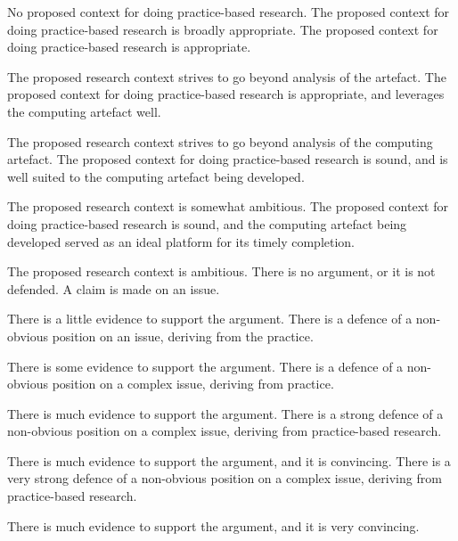 \documentclass{../../fal_assignment}
\begin{document}
\begin{markingrubric}
%
        \grade\fail No proposed context for doing practice-based research.
        \grade The proposed context for doing practice-based research is broadly appropriate.
        \grade The proposed context for doing practice-based research is appropriate.
        \par The proposed research context strives to go beyond analysis of the artefact.
        \grade The proposed context for doing practice-based research is appropriate, and leverages the computing artefact well.
        \par The proposed research context strives to go beyond analysis of the computing artefact.
        \grade The proposed context for doing practice-based research is sound, and is well suited to the computing artefact being developed.
        \par The proposed research context is somewhat ambitious.
        \grade The proposed context for doing practice-based research is sound, and the computing artefact being developed served as an ideal platform for its timely completion. 
        \par The proposed research context is ambitious.
%
        \grade\fail There is no argument, or it is not defended.
        \grade A claim is made on an issue.
            \par There is a little evidence to support the argument.
        \grade There is a defence of a non-obvious position on an issue, deriving from the practice.
            \par There is some evidence to support the argument.
        \grade There is a defence of a non-obvious position on a complex issue, deriving from practice.
            \par There is much evidence to support the argument.
        \grade There is a strong defence of a non-obvious position on a complex issue, deriving from practice-based research.
            \par There is much evidence to support the argument, and it is convincing.
        \grade There is a very strong defence of a non-obvious position on a complex issue, deriving from practice-based research.
            \par There is much evidence to support the argument, and it is very convincing.
%

\end{markingrubric}
\end{document}
